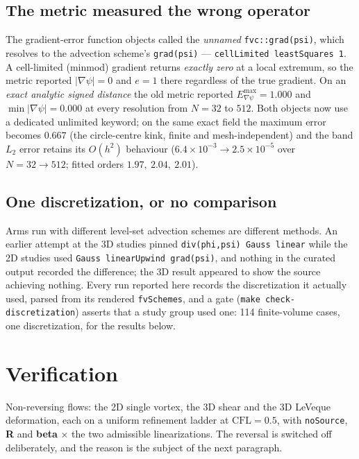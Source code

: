 \documentclass[preprint,3p,11pt]{elsarticle}
\newcommand{\psilev}{\psi}
\newcommand{\gradpsi}{\lvert\nabla\psilev\rvert}
\begin{document}
\subsection{The metric measured the wrong operator}
\label{sec:metric}
The gradient-error function objects called the \emph{unnamed}
\texttt{fvc::grad(psi)}, which resolves to the advection scheme's
\texttt{grad(psi)} --- \texttt{cellLimited leastSquares 1}. A cell-limited
(minmod) gradient returns \emph{exactly zero} at a local extremum, so the
metric reported $\gradpsi = 0$ and $e = 1$ there regardless of the true
gradient. On an \emph{exact analytic signed distance} the old metric reported
$E^{\max}_{\nabla\psi} = 1.000$ and $\min\gradpsi = 0.000$ at every resolution
from $N=32$ to $512$. Both objects now use a dedicated unlimited keyword; on
the same exact field the maximum error becomes $0.667$ (the circle-centre
kink, finite and mesh-independent) and the band $L_2$ error retains its
$O(h^2)$ behaviour ($6.4\times10^{-3} \to 2.5\times10^{-5}$ over
$N=32\to512$; fitted orders $1.97,\ 2.04,\ 2.01$).

\subsection{One discretization, or no comparison}
Arms run with different level-set advection schemes are different methods. An
earlier attempt at the 3D studies pinned \texttt{div(phi,psi) Gauss linear}
while the 2D studies used \texttt{Gauss linearUpwind grad(psi)}, and nothing in
the curated output recorded the difference; the 3D result appeared to show the
source achieving nothing. Every run reported here records the discretization it
actually used, parsed from its rendered \texttt{fvSchemes}, and a gate
(\texttt{make check-discretization}) asserts that a study group used one:
114 finite-volume cases, one discretization, for the results below.

\section{Verification}
\label{sec:verification}

Non-reversing flows: the 2D single vortex, the 3D shear and the 3D LeVeque
deformation, each on a uniform refinement ladder at $\mathrm{CFL} = 0.5$, with
\texttt{noSource}, \textbf{R} and \textbf{beta} $\times$ the two admissible
linearizations. The reversal is switched off deliberately, and the reason is
the subject of the next paragraph.
\end{document}
